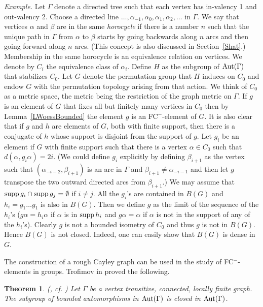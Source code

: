 \documentclass{emsprocart}
\newtheorem{theorem}{Theorem}[section]
\theoremstyle{definition}
\begin{document}
{\em Example.}  Let $\Gamma$ denote a directed tree such that each
vertex has in-valency 1 and out-valency 2.  Choose a directed line
$\ldots, \alpha_{-1}, \alpha_0, \alpha_1, \alpha_2, \ldots$ in $\Gamma$.
We say that vertices $\alpha$
and $\beta$ are in the same {\em horocycle} if there is a number $n$
such that the unique path in $\Gamma$ from $\alpha$ to $\beta$
starts by going backwards along
$n$ arcs and then going forward along $n$ arcs.
(This concept is
also discussed in Section~\ref{Shat}.) Membership in the same
horocycle is an equivalence  
relation on vertices. We denote by $C_i$ the equivalence
class of $\alpha_i$.
Define $H$ as the subgroup of ${\mbox{${\rm Aut}(\Gamma)$}}$ that stabilizes $C_0$.  Let $G$
denote the permutation group that $H$ induces on $C_0$ and endow $G$
with the permutation topology arising from that action.  We think of
$C_0$ as a metric space, the metric being the restriction of the graph
metric on $\Gamma$.  If $g$ is an
element of $G$ that fixes all but finitely many vertices in $C_0$ then
by Lemma~\ref{LWoessBounded} the element $g$ is an FC$^-$-element of
$G$.  It is also clear that if $g$ and $h$ are elements of $G$, both
with finite support, then there is a conjugate of $h$ whose support is
disjoint from the support of $g$.  Let $g_i$ be an element if $G$ with
finite support such that there is a vertex $\alpha\in C_0$ such that
$d(\alpha, g_i \alpha)=2i$.  (We could define $g_i$ explicitly by
defining $\beta_{i+1}$ as the vertex such that $(\alpha_{-i-2},
\beta_{i+1})$ is an arc in $\Gamma$ and $\beta_{i+1}\neq \alpha_{-i-1}$
and then let $g$ transpose the two outward directed arcs from
$\beta_{i+1}$.)   We may assume that ${\mbox{${\rm supp}\,$}} g_i\cap {\mbox{${\rm supp}\,$}} g_j=\emptyset$ if
$i\neq j$.  All the $g_i$'s are contained in $B(G)$ and $h_i=g_1\ldots
g_1$ is also in $B(G)$.   Then
we define $g$ as the limit of the sequence of the $h_i$'s ($g\alpha=h_i\alpha$
if $\alpha$ is in ${\mbox{${\rm supp}\,$}} h_i$ and $g\alpha=\alpha$ if $\alpha$ is not
in the support of any of the $h_i$'s).  Clearly $g$ is not a bounded
isometry of $C_0$ and thus $g$ is not in $B(G)$.  Hence $B(G)$ is not closed.
Indeed, one can easily show that $B(G)$ is dense in $G$.

\bigskip

The construction of a rough Cayley graph can be used in the study
of FC$^-$-elements in groups.  Trofimov in \cite{Trofimov1985a} proved
the following.

\begin{theorem}{\rm (\cite{Trofimov1985a}, cf. \cite[Theorem~3]{Woess1992})}
Let $\Gamma$ be a vertex transitive, connected, locally finite graph.  The
subgroup of bounded automorphisms in ${\mbox{${\rm Aut}(\Gamma)$}}$ is closed in ${\mbox{${\rm Aut}(\Gamma)$}}$.
\end{theorem}
\end{document}
